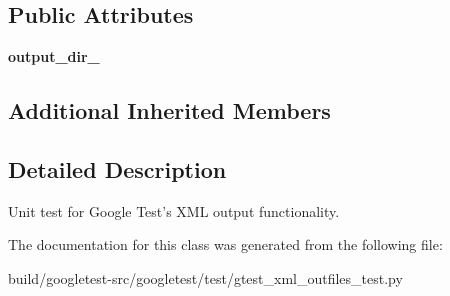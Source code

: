 \subsection*{Public Attributes}
\begin{DoxyCompactItemize}
\item 
\mbox{\label{classgtest__xml__outfiles__test_1_1GTestXMLOutFilesTest_aa5c31cd97047bc1d3060f4d27bc956a4}} 
{\bfseries output\+\_\+dir\+\_\+}
\end{DoxyCompactItemize}
\subsection*{Additional Inherited Members}


\subsection{Detailed Description}
\begin{DoxyVerb}Unit test for Google Test's XML output functionality.\end{DoxyVerb}
 

The documentation for this class was generated from the following file\+:\begin{DoxyCompactItemize}
\item 
build/googletest-\/src/googletest/test/gtest\+\_\+xml\+\_\+outfiles\+\_\+test.\+py\end{DoxyCompactItemize}

